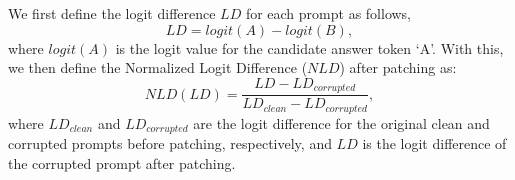\documentclass[11pt]{article}
\begin{document}
We first define the logit difference $LD$ for each prompt as follows,
\begin{equation}
    LD = logit(A) - logit(B),
\end{equation}
where $logit(A)$ is the logit value for the candidate answer token `A'. With this, we then define the Normalized Logit Difference ($NLD$) after patching as:
\begin{equation}
    NLD(LD) = \frac{LD - LD_{corrupted}}{LD_{clean} - LD_{corrupted}},
\end{equation}
where $LD_{clean}$ and $LD_{corrupted}$ are the logit difference for the original clean and corrupted prompts before patching, respectively, and $LD$ is the logit difference of the corrupted prompt after patching. 
\end{document}
